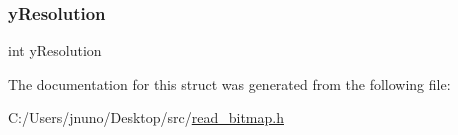 \hypertarget{struct_bitmap_info_header_aa2f350dd0bda750656d5db5f5e37b2b3}{}\label{struct_bitmap_info_header_aa2f350dd0bda750656d5db5f5e37b2b3} 
\subsubsection{\texorpdfstring{y\+Resolution}{yResolution}}
{\footnotesize\ttfamily int y\+Resolution}



The documentation for this struct was generated from the following file\+:\begin{DoxyCompactItemize}
\item 
C\+:/\+Users/jnuno/\+Desktop/src/\hyperlink{read__bitmap_8h}{read\+\_\+bitmap.\+h}\end{DoxyCompactItemize}
